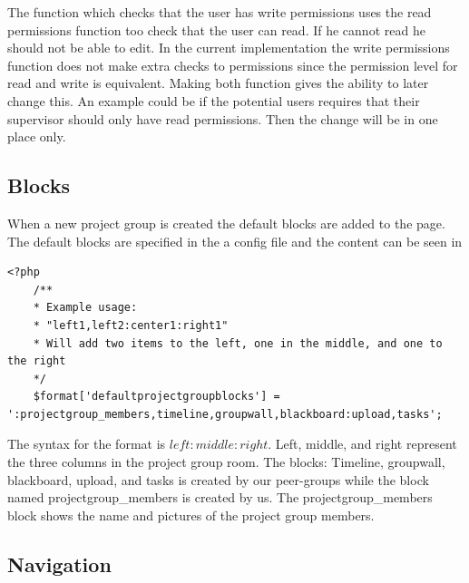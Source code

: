 The function   which checks that the user has write permissions uses the read permissions function too check that the user can read.
If he cannot read he should not be able to edit. 
In the current implementation the write permissions function does not make extra checks to permissions since the permission level for read and write is equivalent.
Making both function gives the ability to later change this.
An example could be if the potential users requires that their supervisor should only have read permissions. 
Then the change will be in one place only. 

\subsection{Blocks}
\label{sec:implprojectgroupblocks}
When a new project group is created the default blocks are added to the page. 
The default blocks are specified in the a config file and the content can be seen in 


\begin{lstlisting}[style=phpCode, caption=\myCaption{The default block configuration}, label=moodledaultblock]
<?php
	/**
	* Example usage:
	* "left1,left2:center1:right1"
	* Will add two items to the left, one in the middle, and one to the right
	*/
	$format['defaultprojectgroupblocks'] = ':projectgroup_members,timeline,groupwall,blackboard:upload,tasks';
\end{lstlisting}
The syntax for the format is $left:middle:right$. 
Left, middle, and right represent the three columns in the project group room. 
The blocks: Timeline, groupwall, blackboard, upload, and tasks is created by our peer-groups while the block named projectgroup\_members is created by us. 
The projectgroup\_members block shows the name and pictures of the project group members. 

	
	






\subsection{Navigation}

























